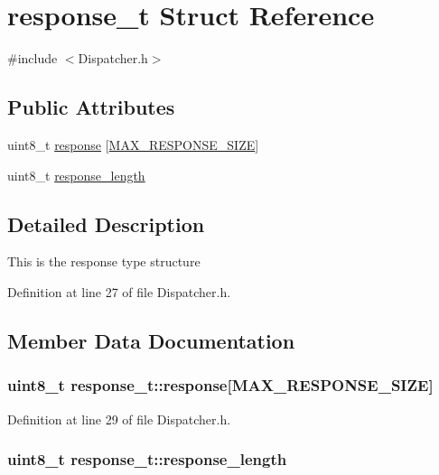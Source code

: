 \hypertarget{structresponse__t}{\section{response\-\_\-t \-Struct \-Reference}
\label{structresponse__t}
}


{\ttfamily \#include $<$\-Dispatcher.\-h$>$}

\subsection*{\-Public \-Attributes}
\begin{DoxyCompactItemize}
\item 
uint8\-\_\-t \hyperlink{structresponse__t_a2cc532437f164e1982a25e51aedcd09d}{response} \mbox{[}\hyperlink{_dispatcher_8h_a836f11ea44075aa0ac768c646e40adaa}{\-M\-A\-X\-\_\-\-R\-E\-S\-P\-O\-N\-S\-E\-\_\-\-S\-I\-Z\-E}\mbox{]}
\item 
uint8\-\_\-t \hyperlink{structresponse__t_aeaab0ceac7abfb8698b31a02f8f9bf36}{response\-\_\-length}
\end{DoxyCompactItemize}


\subsection{\-Detailed \-Description}
\-This is the response type structure 

\-Definition at line 27 of file \-Dispatcher.\-h.



\subsection{\-Member \-Data \-Documentation}
\hypertarget{structresponse__t_a2cc532437f164e1982a25e51aedcd09d}{
\subsubsection[{response}]{\setlength{\rightskip}{0pt plus 5cm}uint8\-\_\-t {\bf response\-\_\-t\-::response}\mbox{[}{\bf \-M\-A\-X\-\_\-\-R\-E\-S\-P\-O\-N\-S\-E\-\_\-\-S\-I\-Z\-E}\mbox{]}}}\label{structresponse__t_a2cc532437f164e1982a25e51aedcd09d}


\-Definition at line 29 of file \-Dispatcher.\-h.

\hypertarget{structresponse__t_aeaab0ceac7abfb8698b31a02f8f9bf36}{
\subsubsection[{response\-\_\-length}]{\setlength{\rightskip}{0pt plus 5cm}uint8\-\_\-t {\bf response\-\_\-t\-::response\-\_\-length}}}\label{structresponse__t_aeaab0ceac7abfb8698b31a02f8f9bf36}


